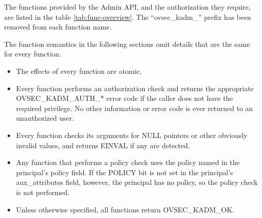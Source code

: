The functions provided by the Admin API, and the authorization they
require, are listed in the table \ref{tab:func-overview}.  The
``ovsec_kadm_'' prefix has been removed from each function name.

The function semantics in the following sections omit details that are
the same for every function.

\begin{itemize}
\item The effects of every function are atomic.

\item Every function performs an authorization check and returns
the appropriate OVSEC_KADM_AUTH_* error code if the caller does not
have the required privilege.  No other information or error code is
ever returned to an unauthorized user.

\item Every function checks its arguments for NULL pointers or other
obviously invalid values, and returns EINVAL if any are detected.

\item Any function that performs a policy check uses the policy named
in the principal's policy field.  If the POLICY bit is not set in the
principal's aux_attributes field, however, the principal has no
policy, so the policy check is not performed.

\item Unless otherwise specified, all functions return OVSEC_KADM_OK.
\end{itemize}

